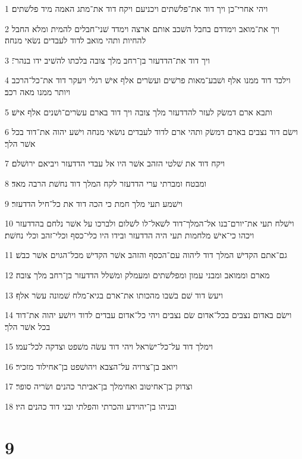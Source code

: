 \par 1 ויהי אחרי־כן ויך דוד את־פלשׁתים ויכניעם ויקח דוד את־מתג האמה מיד פלשׁתים׃
\par 2 ויך את־מואב וימדדם בחבל השׁכב אותם ארצה וימדד שׁני־חבלים להמית ומלא החבל להחיות ותהי מואב לדוד לעבדים נשׂאי מנחה׃
\par 3 ויך דוד את־הדדעזר בן־רחב מלך צובה בלכתו להשׁיב ידו בנהר־׃
\par 4 וילכד דוד ממנו אלף ושׁבע־מאות פרשׁים ועשׂרים אלף אישׁ רגלי ויעקר דוד את־כל־הרכב ויותר ממנו מאה רכב׃
\par 5 ותבא ארם דמשׂק לעזר להדדעזר מלך צובה ויך דוד בארם עשׂרים־ושׁנים אלף אישׁ׃
\par 6 וישׂם דוד נצבים בארם דמשׂק ותהי ארם לדוד לעבדים נושׂאי מנחה וישׁע יהוה את־דוד בכל אשׁר הלך׃
\par 7 ויקח דוד את שׁלטי הזהב אשׁר היו אל עבדי הדדעזר ויביאם ירושׁלם׃
\par 8 ומבטח ומברתי ערי הדדעזר לקח המלך דוד נחשׁת הרבה מאד׃
\par 9 וישׁמע תעי מלך חמת כי הכה דוד את כל־חיל הדדעזר׃
\par 10 וישׁלח תעי את־יורם־בנו אל־המלך־דוד לשׁאל־לו לשׁלום ולברכו על אשׁר נלחם בהדדעזר ויכהו כי־אישׁ מלחמות תעי היה הדדעזר ובידו היו כלי־כסף וכלי־זהב וכלי נחשׁת׃
\par 11 גם־אתם הקדישׁ המלך דוד ליהוה עם־הכסף והזהב אשׁר הקדישׁ מכל־הגוים אשׁר כבשׁ׃
\par 12 מארם וממואב ומבני עמון ומפלשׁתים ומעמלק ומשׁלל הדדעזר בן־רחב מלך צובה׃
\par 13 ויעשׂ דוד שׁם בשׁבו מהכותו את־ארם בגיא־מלח שׁמונה עשׂר אלף׃
\par 14 וישׂם באדום נצבים בכל־אדום שׂם נצבים ויהי כל־אדום עבדים לדוד ויושׁע יהוה את־דוד בכל אשׁר הלך׃
\par 15 וימלך דוד על־כל־ישׂראל ויהי דוד עשׂה משׁפט וצדקה לכל־עמו׃
\par 16 ויואב בן־צרויה על־הצבא ויהושׁפט בן־אחילוד מזכיר׃
\par 17 וצדוק בן־אחיטוב ואחימלך בן־אביתר כהנים ושׂריה סופר׃
\par 18 ובניהו בן־יהוידע והכרתי והפלתי ובני דוד כהנים היו׃

\chapter{9}

